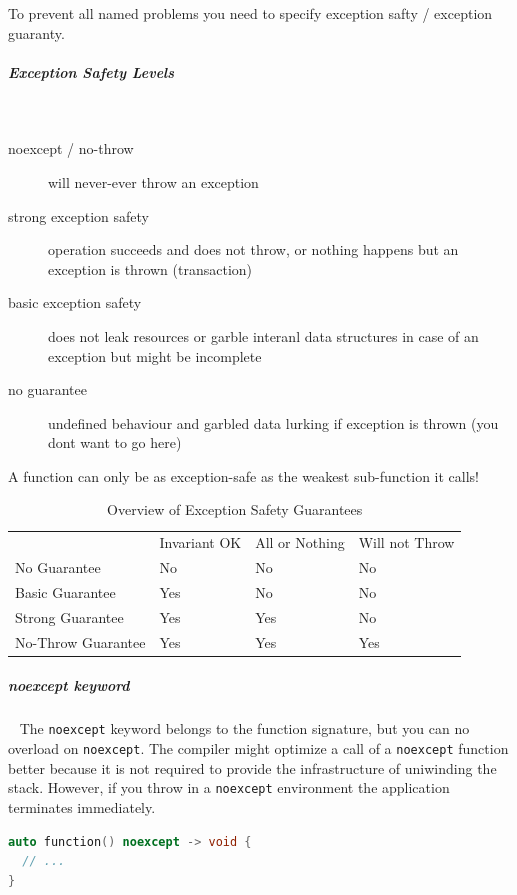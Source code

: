 \documentclass[11pt,twoside,landscape]{article}
\begin{document}
\begin{multicols}{2}
To prevent all named problems you need to specify exception safty / exception guaranty.

\subparagraph{Exception Safety Levels} \
\label{sec:org9af22e6}
\begin{description}
\item[{noexcept / no-throw}] will never-ever throw an exception
\item[{strong exception safety}] operation succeeds and does not throw, or nothing happens but an exception is thrown (transaction)
\item[{basic exception safety}] does not leak resources or garble interanl data structures in case of an exception but might be incomplete
\item[{no guarantee}] undefined behaviour and garbled data lurking if exception is thrown (you dont want to go here)
\end{description}


A function can only be as exception-safe as the weakest sub-function it calls!


\begin{table}[htbp]
\caption{\label{tbl:overview-of-exception-safety-guarantees}Overview of Exception Safety Guarantees}
\centering
\begin{tabular}{llll}
 & Invariant OK & All or Nothing & Will not Throw\\[0pt]
No Guarantee & No & No & No\\[0pt]
Basic Guarantee & Yes & No & No\\[0pt]
Strong Guarantee & Yes & Yes & No\\[0pt]
No-Throw Guarantee & Yes & Yes & Yes\\[0pt]
\end{tabular}
\end{table}

\subparagraph{noexcept keyword} \
\label{sec:org5d4cfc2}
The \texttt{noexcept} keyword belongs to the function signature, but you can no overload on \texttt{noexcept}.
The compiler might optimize a call of a \texttt{noexcept} function better because it is not required to provide the infrastructure of uniwinding the stack.
However, if you throw in a \texttt{noexcept} environment the application terminates immediately.


\begin{lstlisting}[language=c++,label=lst:exaple-for-noexcept-in-signature,caption={Exaple for noexcept in signature},captionpos=b,numbers=none]
auto function() noexcept -> void {
  // ...
}


\end{lstlisting}
\end{multicols}
\end{document}
